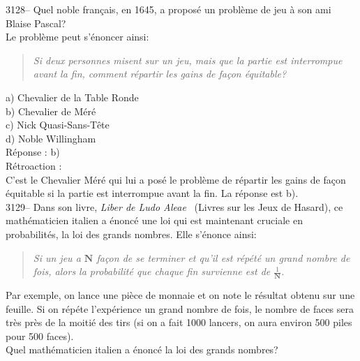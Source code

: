 \documentclass[letterpaper, 12pt]{article}
\begin{document}
3128-- Quel noble fran\c cais, en 1645, a propos\'e un probl\`eme de jeu \`a son ami Blaise Pascal?\\
Le probl\`eme peut s'\'enoncer ainsi:\\
\begin{quote}
\emph{Si deux personnes misent sur un jeu, mais que la partie est interrompue avant la fin, comment r\'epartir les gains de fa\c con \'equitable?}\\
\end{quote}

a) Chevalier de la Table Ronde\\
b) Chevalier de M\'er\'e\\
c) Nick Quasi-Sans-T\^ete\\
d) Noble Willingham\\


R\'eponse : b)\\

R\'etroaction :\\
C'est le Chevalier M\'er\'e qui lui a pos\'e le probl\`eme de r\'epartir les gains de fa\c con \'equitable si la partie est interrompue avant la fin. La r\'eponse est b).\\




3129-- Dans son livre, \og \emph{Liber de Ludo Aleae} \fg \ (Livres sur les Jeux de Hasard), ce math\'ematicien italien a \'enonc\'e une loi qui est maintenant cruciale en probabilit\'es, la loi des grands nombres. Elle s'\'enonce ainsi:
\begin{center}
\begin{quote}
\emph{Si un jeu a $\textbf{N}$ fa\c con de se terminer et qu'il est r\'ep\'et\'e un grand nombre de fois, alors la probabilit\'e que chaque fin survienne est de $\frac{1}{\textbf{N}}$.}\\
\end{quote}
\end{center}
Par exemple, on lance une pi\`ece de monnaie et on note le r\'esultat obtenu sur une feuille. Si on r\'ep\'ete l'exp\'erience un grand nombre de fois, le nombre de faces sera tr\`es pr\`es de la moiti\'e des tirs (si on a fait 1000 lancers, on aura environ 500 piles pour 500 faces).\\
Quel math\'ematicien italien a \'enonc\'e la loi des grands nombres?\\
\end{document}
